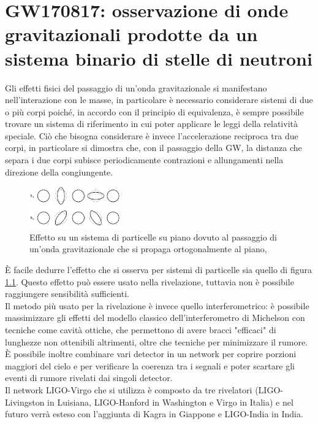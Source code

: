 \chapter[Osservazione di GW da BNS]{GW170817: osservazione di onde gravitazionali prodotte da un sistema binario di stelle di neutroni}
\label{chapter:gw170817}
Gli effetti fisici del passaggio di un'onda gravitazionale si manifestano nell'interazione con le masse, in particolare è necessario considerare sistemi di due o più corpi poiché, in accordo con il principio di equivalenza, è sempre possibile trovare un sistema di riferimento in cui poter applicare le leggi della relatività speciale. Ciò che bisogna considerare è invece l'accelerazione reciproca tra due corpi, in particolare si dimostra che, con il passaggio della GW, la distanza che separa i due corpi subisce periodicamente contrazioni e allungamenti nella direzione della congiungente.\\
\begin{figure}
	\vspace{-15pt}
	\begin{center}
		\includegraphics[width=0.35\textwidth]{figures/Capitolo_2/gw_effect.png}
	\end{center}
	\vspace{-5pt}
	\caption{Effetto su un sistema di particelle su piano dovuto al passaggio di un'onda gravitazionale che si propaga ortogonalmente al piano, \cite{universe3030059}}
	\label{fig:gweffect}
	\vspace{-10pt}
\end{figure}
È facile dedurre l'effetto che si osserva per sistemi di particelle sia quello di figura \ref{fig:gweffect}. Questo effetto può essere usato nella rivelazione, tuttavia non è possibile raggiungere sensibilità sufficienti. \\
Il metodo più usato per la rivelazione è invece quello interferometrico: è possibile massimizzare gli effetti del modello classico dell'interferometro di Michelson con tecniche come cavità ottiche, che permettono di avere bracci "efficaci" di lunghezze non ottenibili altrimenti, oltre che tecniche per minimizzare il rumore.\\
È possibile inoltre combinare vari detector in un network per coprire porzioni maggiori del cielo e per verificare la coerenza tra i segnali e poter scartare gli eventi di rumore rivelati dai singoli detector.\\
Il network LIGO-Virgo che si utilizza è composto da tre rivelatori (LIGO-Livingston in Luisiana, LIGO-Hanford in Washington e Virgo in Italia) e nel futuro verrà esteso con l'aggiunta di Kagra in Giappone e LIGO-India in India.

